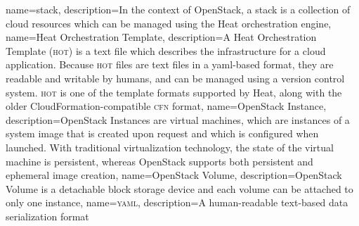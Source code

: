 {
  name={stack},
  description={In the context of \gls{OpenStack}, a stack is a
  collection of cloud resources which can be managed using the
  \gls{Heat} orchestration engine},
}
{
  name={Heat Orchestration Template},
  description={A \gls{Heat} Orchestration Template (\textsc{hot}) is a text
  file which describes the infrastructure for a cloud application.
  Because \textsc{hot} files are text files in a \gls{yaml}-based format, they
  are readable and writable by humans, and can be managed using a
  version control system.  \textsc{hot} is one of the template formats
  supported by Heat, along with the older CloudFormation-compatible
  \textsc{cfn} format},
}
{
  name={OpenStack Instance},
  description={OpenStack Instances are virtual machines, which are
  instances of a system image that is created upon request and which
  is configured when launched. With traditional virtualization
  technology, the state of the virtual machine is persistent, whereas
  OpenStack supports both persistent and ephemeral image creation},
}
{
  name={OpenStack Volume},
  description={OpenStack Volume is a detachable block storage device
  and each volume can be attached to only one instance},
}
{
  name={\textsc{yaml}},
  description={A human-readable text-based data serialization
  format}
}
